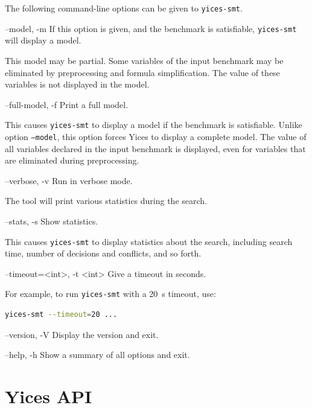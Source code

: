 \documentclass[11pt,twoside,fleqn,openright,titlepage]{cslreport}
\newenvironment{options}{
\begin{list}{}{
\setlength{\labelsep}{1.8ex}
\setlength{\labelwidth}{0pt}
\setlength{\itemindent}{-0.5\leftmargin}
\settowidth{\leftmargin}{\texttt{--}}
\renewcommand{\makelabel}{\optionlabel}}}
{\end{list}}
\newcommand*\optionlabel[1]{\hspace\labelsep\texttt{#1}}
\begin{document}
The following command-line options can be given to \texttt{yices-smt}.
\begin{options}
\item[--model, -m] If this option is given, and the benchmark
  is satisfiable, \texttt{yices-smt} will display a model.

  This model may be partial. Some variables of the input benchmark may
  be eliminated by preprocessing and formula simplification. The value
  of these variables is not displayed in the model.

\item[--full-model, -f] Print a full model.

  This causes \texttt{yices-smt} to display a model if the benchmark
  is satisfiable. Unlike option \texttt{--model}, this option forces
  Yices to display a complete model. The value of all variables
  declared in the input benchmark is displayed, even for variables
  that are eliminated during preprocessing.

\item[--verbose, -v] Run in verbose mode.

  The tool will print various statistics during the search.

\item[--stats, -s] Show statistics.

  This causes \texttt{yices-smt} to display statistics about the
  search, including search time, number of decisions and conflicts,
  and so forth.

\item[--timeout=<int>, -t <int>] Give a timeout in seconds.

  For example, to run \texttt{yices-smt} with a 20~s timeout, use:
  \begin{small}
  \begin{lstlisting}[language=sh]
     yices-smt --timeout=20 ...
  \end{lstlisting}
  \end{small}
\item[--version, -V] Display the version and exit.

\item[--help, -h] Show a summary of all options and exit.
\end{options}


\chapter{Yices API}
\label{yices-api}
\end{document}
